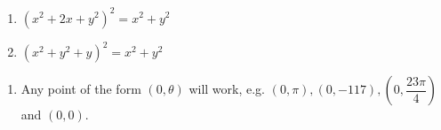 \begin{multicols}{2}

\begin{enumerate}

\setcounter{enumi}{\value{HW}}

\item  $\left( x^{2} + 2x + y^{2} \right)^{2} = x^{2} + y^{2}$
\item  $\left( x^{2} + y^{2} + y\right)^{2} = x^{2} + y^{2}$

\setcounter{HW}{\value{enumi}}

\end{enumerate}

\end{multicols}

\begin{enumerate}

\setcounter{enumi}{\value{HW}}

\item Any point of the form $(0, \theta)$ will work, e.g. $(0, \pi), (0, -117), \left( 0, \dfrac{23\pi}{4} \right) $ and $(0, 0).$

\end{enumerate}

\closegraphsfile